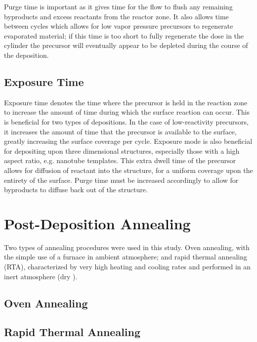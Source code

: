 Purge time is important as it gives time for the  flow to flush any remaining byproducts and excess reactants from the reactor zone. It also allows time between cycles which allows for low vapor pressure precursors to regenerate evaporated material; if this time is too short to fully regenerate the dose in the cylinder the precursor will eventually appear to be depleted during the course of the deposition. 


\subsection{Exposure Time}

Exposure time denotes the time where the precursor is held in the reaction zone to increase the amount of time during which the surface reaction can occur. This is beneficial for two types of depositions. In the case of low-reactivity precursors, it increases the amount of time that the precursor is available to the surface, greatly increasing the surface coverage per cycle. Exposure mode is also beneficial for depositing upon three dimensional structures, especially those with a high aspect ratio, e.g. nanotube templates. This extra dwell time of the precursor allows for diffusion of reactant into the structure, for a uniform coverage upon the entirety of the surface. Purge time must be increased accordingly to allow for byproducts to diffuse back out of the structure. 


\section{Post-Deposition Annealing}
\label{sec:SampFab-Annealing}

Two types of annealing procedures were used in this study. Oven annealing, with the simple use of a furnace in ambient atmosphere; and rapid thermal annealing (RTA), characterized by very high heating and cooling rates and performed in an inert atmosphere (dry ). 



\subsection{Oven Annealing}




\subsection{Rapid Thermal Annealing}







